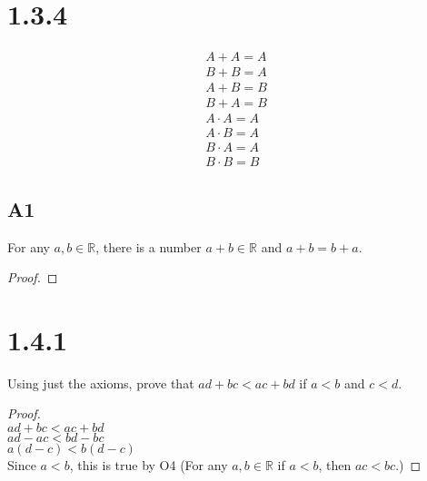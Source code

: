 \documentclass{article}
\begin{document}
    \section*{1.3.4}
        \begin{gather*}
            A+A=A \\
            B+B=A \\
            A+B=B \\
            B+A=B \\
            A \cdot A=A \\
            A \cdot B=A \\
            B \cdot A=A \\
            B \cdot B=B
        \end{gather*}

        \subsection*{A1}
        For any \( a, b \in \mathbb{R} \), there is a number \( a + b \in \mathbb{R} \) and \( a + b = b + a \).
        
        \begin{proof}
            
        \end{proof}

    \section*{1.4.1}
        Using just the axioms, prove that $ad+bc<ac+bd$ if $a<b$ and $c<d$.

        \begin{proof}\mbox{}\\
            $ad+bc<ac+bd$ \\
            $ad-ac<bd-bc$ \\
            $a(d-c)<b(d-c)$ \\
            Since $a<b$, this is true by O4 (For any $a,b \in \mathbb{R}$ if $a<b$, then $ac<bc$.)
        \end{proof}
        
\end{document}
